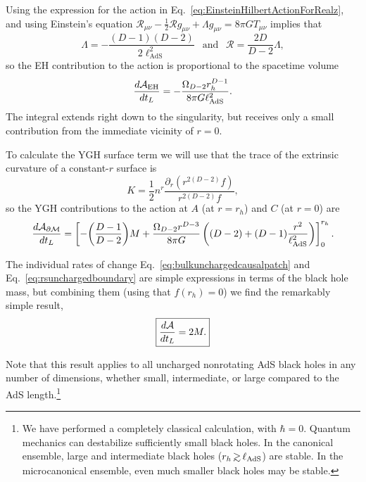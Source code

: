 \documentclass[12pt]{article}
\def\gsim{ \lower .75ex \hbox{$\sim$} \llap{\raise .27ex
\hbox{$>$}} }
\numberwithin{equation}{section}
\def\CA{{\cal A}}
\newcommand{\lads}{\ell_{\text{AdS}}}
\begin{document}
Using the expression for the action in Eq.~\ref{eq:EinsteinHilbertActionForRealz}, and using Einstein's equation $\mathcal{R}_{\mu \nu} - \frac{1}{2} \mathcal{R} g_{\mu \nu} + \Lambda g_{\mu \nu} = 8 \pi G T_{\mu \nu}$ implies that
\begin{equation}
\Lambda = -\frac{(D-1)(D-2)}{2 \lads^2} \ \  \textrm{ and } \ \  \mathcal{R} = \frac{2D}{D-2} \Lambda, \label{eq:LambdaAndR}
 \end{equation}
so the EH contribution to the action is proportional to the spacetime volume
\begin{equation}
\frac{d\CA_\textrm{EH}}{dt_L}  %
= -\frac{\Omega_{D-2} r_h^{D-1}}{8 \pi G \lads^2} . \label{eq:bulkunchargedcausalpatch}
 \end{equation}
The integral extends right down to the singularity, but receives only a small contribution from the immediate vicinity of $r=0$.

To calculate the YGH surface term we will use that the trace of the extrinsic curvature of a constant-$r$  surface is
\begin{equation}
K =  \frac{1}{2} n^r  \frac{\partial_r \left(   r^{2(D-2)  } f \right)  }{ r^{2(D-2) }f},
\label{eq:K}
\end{equation}
so the YGH contributions to the action at $A$ (at $r = r_h$)
and  $C$ (at $r=0$) are
\begin{equation}
\frac{d\CA_{\partial \mathcal{M}}}{dt_L} =  \left[  - \bigg( \frac{D-1 }{D-2}\bigg) M   + \frac{\Omega_{D-2} r^{D-3} }{8 \pi G}  \left( (D - 2 ) + (D-1) \frac{r^2}{\lads^2} \right) \right]^{r_h}_0 . \label{eq:rsunchargedboundary}
 \end{equation}

 The individual rates of change Eq.~\ref{eq:bulkunchargedcausalpatch} and Eq.~\ref{eq:rsunchargedboundary} are simple expressions in terms of the black hole mass, but combining them (using that $f(r_h) = 0$) we find the remarkably simple result,
  \begin{equation}
\boxed{\frac{d \CA}{dt_L} = 2M.} \label{eq:unchargedactionincrement}
 \end{equation}

Note that this result applies to all uncharged nonrotating  AdS black holes in any number of dimensions, whether small, intermediate, or large compared to the AdS length.\footnote{We have performed a completely classical calculation, with $\hbar = 0$. Quantum mechanics can destabilize sufficiently small black holes. In the canonical ensemble, large and intermediate black holes ($r_h \, \gsim \, \lads$) are stable. In the microcanonical ensemble, even much smaller black holes may be stable.}
\end{document}
